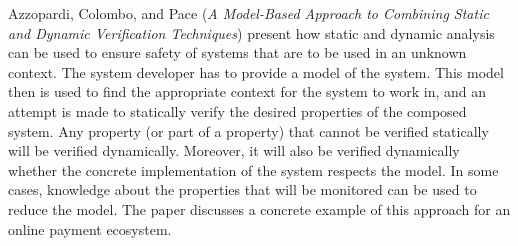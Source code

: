 

Azzopardi, Colombo, and Pace \cite{isola-2016-azzopardi} ({\em A
Model-Based Approach to Combining Static and Dynamic Verification
Techniques}) present how static and dynamic analysis can be used to
ensure safety of systems that are to be used in an unknown
context. The system developer has to provide a model of the
system. This model then is used to find the appropriate context for the
system to work in, and an attempt is made to statically verify the
desired properties of the composed system. Any property (or part of a property)
that cannot be verified statically will be verified
dynamically. Moreover, it will also be verified dynamically whether
the concrete implementation of the system respects the
model. In some cases, knowledge about the properties that
will be monitored can be used to reduce the model. The paper discusses
a concrete example of this approach for an online payment ecosystem.

